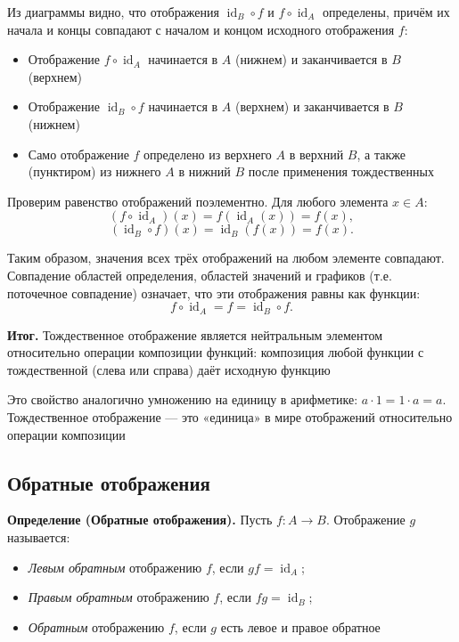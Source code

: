 \documentclass[a4paper,12pt]{article}
\theoremstyle{definition}
\theoremstyle{plain}
\theoremstyle{remark}
\begin{document}
		Из диаграммы видно, что отображения $\operatorname{id}_B \circ f$ и $f \circ \operatorname{id}_A$ определены, причём их начала и концы совпадают с началом и концом исходного отображения $f$:
	\begin{itemize}
	\item Отображение $f \circ \operatorname{id}_A$ начинается в $A$ (нижнем) и заканчивается в $B$ (верхнем)
	\item Отображение $\operatorname{id}_B \circ f$ начинается в $A$ (верхнем) и заканчивается в $B$ (нижнем)
	\item Само отображение $f$ определено из верхнего $A$ в верхний $B$, а также (пунктиром) из нижнего $A$ в нижний $B$ после применения тождественных
	\end{itemize}
	
	Проверим равенство отображений поэлементно. Для любого элемента $x \in A$:
	\[
	(f \circ \operatorname{id}_A)(x) = f(\operatorname{id}_A(x)) = f(x),
	\]
	\[
	(\operatorname{id}_B \circ f)(x) = \operatorname{id}_B(f(x)) = f(x).
	\]
	
	Таким образом, значения всех трёх отображений на любом элементе совпадают. Совпадение областей определения, областей значений и графиков (т.е. поточечное совпадение) означает, что эти отображения равны как функции:
	\[
	f \circ \operatorname{id}_A = f = \operatorname{id}_B \circ f.
	\]
	
	\noindent \textbf{Итог.} Тождественное отображение является нейтральным элементом относительно операции композиции функций: композиция любой функции с тождественной (слева или справа) даёт исходную функцию
	
	
	
	\medskip	
	\begin{tcolorbox}[colback=green!5, colframe=green!50!black, title=Пояснение]
		Это свойство аналогично умножению на единицу в арифметике: $a \cdot 1 = 1 \cdot a = a$. Тождественное отображение — это «единица» в мире отображений относительно операции композиции
	\end{tcolorbox}
	
	\subsection{Обратные отображения}
	
	\noindent \textbf{Определение (Обратные отображения).}
	Пусть $f \colon A \to B$. Отображение $g$ называется:
	\begin{itemize}
		\item \textit{Левым обратным} отображению $f$, если $gf = \operatorname{id}_A$;
		\item \textit{Правым обратным} отображению $f$, если $fg = \operatorname{id}_B$;
		\item \textit{Обратным} отображению $f$, если $g$ есть левое и правое обратное
	\end{itemize}
	
\end{document}
